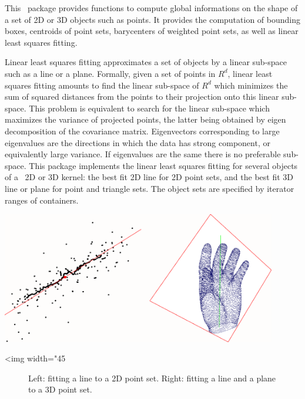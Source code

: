 This \cgal\ package provides functions to compute global informations
on the shape of a set of 2D or 3D objects such as points. It provides the computation of bounding boxes, centroids of point sets, barycenters of weighted point sets, as well as linear least squares fitting.

Linear least squares fitting approximates a set of objects by a linear
sub-space such as a line or a plane. Formally, given a set of points in $R^d$, linear least squares fitting amounts
to find the linear sub-space of $R^d$ which minimizes the sum of squared
distances from the points to their projection onto this linear sub-space. This
problem is equivalent to search for the linear sub-space which maximizes the
variance of projected points, the latter being obtained by eigen decomposition
of the covariance matrix. Eigenvectors corresponding to large eigenvalues are
the directions in which the data has strong component, or equivalently large
variance. If eigenvalues are the same there is no preferable sub-space.
This package implements the linear least squares fitting for
several objects of a \cgal\ 2D or 3D kernel: the best fit 2D line for 2D
point sets, and the best fit 3D line or plane for point and
triangle sets. The object sets are specified by iterator ranges of
containers.

\begin{center}
    \label{fit}
    \begin{ccTexOnly}
      \includegraphics[width=0.9\textwidth]{Principal_component_analysis/fit}
    \end{ccTexOnly}
    \begin{ccHtmlOnly}
        <img width="45%
    \end{ccHtmlOnly}
    \begin{figure}[h]
        \caption{Left: fitting a line to a 2D point set.
                 Right: fitting a line and a plane to a 3D point set.}
    \end{figure}
\end{center}

